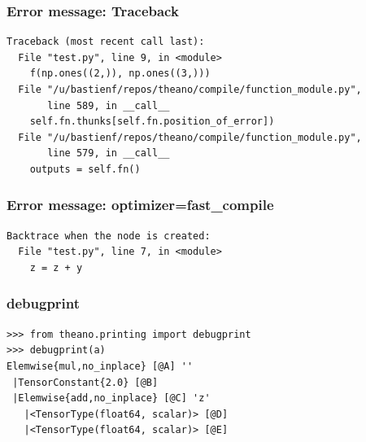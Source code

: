 \documentclass[utf8x,xcolor=pdftex,dvipsnames,table]{beamer}
\begin{document}
\begin{frame}[fragile]
  \frametitle{Error message: Traceback}

\begin{lstlisting}
Traceback (most recent call last):
  File "test.py", line 9, in <module>
    f(np.ones((2,)), np.ones((3,)))
  File "/u/bastienf/repos/theano/compile/function_module.py",
       line 589, in __call__
    self.fn.thunks[self.fn.position_of_error])
  File "/u/bastienf/repos/theano/compile/function_module.py",
       line 579, in __call__
    outputs = self.fn()
\end{lstlisting}
\end{frame}


\begin{frame}[fragile]
  \frametitle{Error message: optimizer=fast\_compile}

\begin{lstlisting}
Backtrace when the node is created:
  File "test.py", line 7, in <module>
    z = z + y

\end{lstlisting}
\end{frame}


\begin{frame}[fragile]
  \frametitle{debugprint}

\begin{lstlisting}
>>> from theano.printing import debugprint
>>> debugprint(a)
Elemwise{mul,no_inplace} [@A] ''
 |TensorConstant{2.0} [@B]
 |Elemwise{add,no_inplace} [@C] 'z'
   |<TensorType(float64, scalar)> [@D]
   |<TensorType(float64, scalar)> [@E]
\end{lstlisting}
\end{frame}



\end{document}
